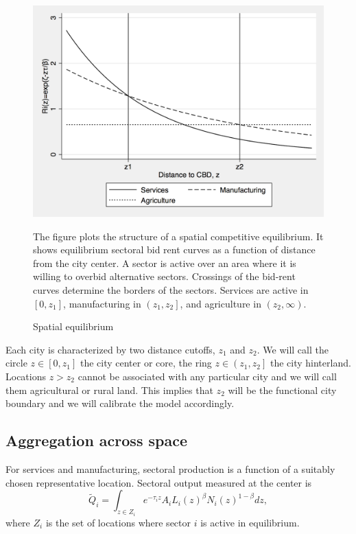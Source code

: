 \documentclass[12pt]{article}
\begin{document}
\begin{figure}[h!]
\caption{Spatial equilibrium\label{fig:BidRent}}
\begin{center}
\includegraphics[scale=0.4]{figures/bid_rent_curves}
\end{center}

\noindent \footnotesize{The figure plots the structure of a spatial competitive equilibrium. It shows equilibrium sectoral bid rent curves as a function of distance from the city center. A sector is active over an area where it is willing to overbid alternative sectors. Crossings of the bid-rent curves determine the borders of the sectors. Services are active in $[0,z_1]$, manufacturing in $\left(z_1,z_2\right]$, and agriculture in $(z_2,\infty)$.}
\end{figure}

Each city is characterized by two distance cutoffs, $z_1$ and $z_2$. We will call the circle $z\in\left[0,z_1\right]$ the city center or core, the ring $z\in\left(z_1,z_2\right]$ the city hinterland. Locations $z>z_2$ cannot be associated with any particular city and we will call them agricultural or rural land. This implies that $z_2$ will be the functional city boundary and we will calibrate the model accordingly.

\subsection{Aggregation across space}
For services and manufacturing, sectoral production is a function of a suitably chosen representative location. Sectoral output measured at the center is
\begin{equation*}
\tilde{Q}_i=\int_{z\in Z_i}e^{-\tau_i z}A_iL_i(z)^\beta N_i(z)^{1-\beta}dz,
\end{equation*}
where $Z_i$ is the set of locations where sector $i$ is active in equilibrium.
\end{document}
